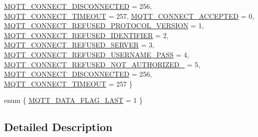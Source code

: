 \begin{DoxyCompactItemize}
\hyperlink{group__mqtt_gga8cf0f360ab20343af37e1d124395a77da321f5ce31b173f235de1a517fcfd00dd}{M\+Q\+T\+T\+\_\+\+C\+O\+N\+N\+E\+C\+T\+\_\+\+D\+I\+S\+C\+O\+N\+N\+E\+C\+T\+ED} = 256, 
\hyperlink{group__mqtt_gga8cf0f360ab20343af37e1d124395a77da57153f2ab4331c6f76a9ee74e1bcfc62}{M\+Q\+T\+T\+\_\+\+C\+O\+N\+N\+E\+C\+T\+\_\+\+T\+I\+M\+E\+O\+UT} = 257, 
\newline
\hyperlink{group__mqtt_gga8cf0f360ab20343af37e1d124395a77da074dc1d289b8e8d4aad91f6a2cb93dc1}{M\+Q\+T\+T\+\_\+\+C\+O\+N\+N\+E\+C\+T\+\_\+\+A\+C\+C\+E\+P\+T\+ED} = 0, 
\hyperlink{group__mqtt_gga8cf0f360ab20343af37e1d124395a77da41f8aa97142be337cb639f94d9145190}{M\+Q\+T\+T\+\_\+\+C\+O\+N\+N\+E\+C\+T\+\_\+\+R\+E\+F\+U\+S\+E\+D\+\_\+\+P\+R\+O\+T\+O\+C\+O\+L\+\_\+\+V\+E\+R\+S\+I\+ON} = 1, 
\hyperlink{group__mqtt_gga8cf0f360ab20343af37e1d124395a77da28ffe49b0175adaa2b9a27cb4873224a}{M\+Q\+T\+T\+\_\+\+C\+O\+N\+N\+E\+C\+T\+\_\+\+R\+E\+F\+U\+S\+E\+D\+\_\+\+I\+D\+E\+N\+T\+I\+F\+I\+ER} = 2, 
\hyperlink{group__mqtt_gga8cf0f360ab20343af37e1d124395a77dade28ec1c2ce3d874e91251d683c92b2a}{M\+Q\+T\+T\+\_\+\+C\+O\+N\+N\+E\+C\+T\+\_\+\+R\+E\+F\+U\+S\+E\+D\+\_\+\+S\+E\+R\+V\+ER} = 3, 
\newline
\hyperlink{group__mqtt_gga8cf0f360ab20343af37e1d124395a77da290cf9037054c42022cc864cfade896a}{M\+Q\+T\+T\+\_\+\+C\+O\+N\+N\+E\+C\+T\+\_\+\+R\+E\+F\+U\+S\+E\+D\+\_\+\+U\+S\+E\+R\+N\+A\+M\+E\+\_\+\+P\+A\+SS} = 4, 
\hyperlink{group__mqtt_gga8cf0f360ab20343af37e1d124395a77dafc4888158dd6ee84269a5f0bfdc12b17}{M\+Q\+T\+T\+\_\+\+C\+O\+N\+N\+E\+C\+T\+\_\+\+R\+E\+F\+U\+S\+E\+D\+\_\+\+N\+O\+T\+\_\+\+A\+U\+T\+H\+O\+R\+I\+Z\+E\+D\+\_\+} = 5, 
\hyperlink{group__mqtt_gga8cf0f360ab20343af37e1d124395a77da321f5ce31b173f235de1a517fcfd00dd}{M\+Q\+T\+T\+\_\+\+C\+O\+N\+N\+E\+C\+T\+\_\+\+D\+I\+S\+C\+O\+N\+N\+E\+C\+T\+ED} = 256, 
\hyperlink{group__mqtt_gga8cf0f360ab20343af37e1d124395a77da57153f2ab4331c6f76a9ee74e1bcfc62}{M\+Q\+T\+T\+\_\+\+C\+O\+N\+N\+E\+C\+T\+\_\+\+T\+I\+M\+E\+O\+UT} = 257
 \}
\item 
enum \{ \hyperlink{group__mqtt_gga0411cd49bb5b71852cecd93bcbf0ca2da79cd00d0a5a8df13207e0c49447df87f}{M\+Q\+T\+T\+\_\+\+D\+A\+T\+A\+\_\+\+F\+L\+A\+G\+\_\+\+L\+A\+ST} = 1
 \}
\end{DoxyCompactItemize}


\subsection{Detailed Description}

\begin{DoxyVerbInclude}
\end{DoxyVerbInclude}
 

